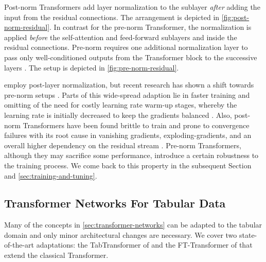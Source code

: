 Post-norm Transformers add layer normalization to the sublayer \emph{after} adding the input from the residual connections. The arrangement is depicted in \cref{fig:post-norm-residual}. In contrast for the pre-norm Transformer, the normalization is applied \emph{before} the self-attention and feed-forward sublayers and inside the residual connections. Pre-norm requires one additional normalization layer to pass only well-conditioned outputs from the Transformer block to the successive layers \autocite[][5]{xiongLayerNormalizationTransformer2020}. The setup is depicted in \cref{fig:pre-norm-residual}.

\textcite[][3]{vaswaniAttentionAllYou2017} employ post-layer normalization, but recent research has shown a shift towards pre-norm setups \autocite[][4]{narangTransformerModificationsTransfer2021}. Parts of this wide-spread adaption lie in faster training and omitting of the need for costly learning rate warm-up stages, whereby the learning rate is initially decreased to keep the gradients balanced \autocites[][2]{xiongLayerNormalizationTransformer2020}[][8]{liuUnderstandingDifficultyTraining2020}. Also, post-norm Transformers have been found brittle to train and prone to convergence failures with its root cause in vanishing gradients, \glspl{exploding-gradient}, and an overall higher dependency on the residual stream \autocites[][8]{liuUnderstandingDifficultyTraining2020}[][1812]{wangLearningDeepTransformer2019}. Pre-norm Transformers, although they may sacrifice some performance, introduce a certain robustness to the training process. We come back to this property in the subsequent Section and \cref{sec:training-and-tuning}.

\subsection{Transformer Networks For Tabular Data}\label{sec:tabular-transformer}

Many of the concepts in \cref{sec:transformer-networks} can be adapted to the tabular domain and only minor architectural changes are necessary. We cover two state-of-the-art adaptations: the TabTransformer of \textcite[][2]{huangTabTransformerTabularData2020} and the FT-Transformer of \textcite[][4]{gorishniyRevisitingDeepLearning2021} that extend the classical Transformer.

